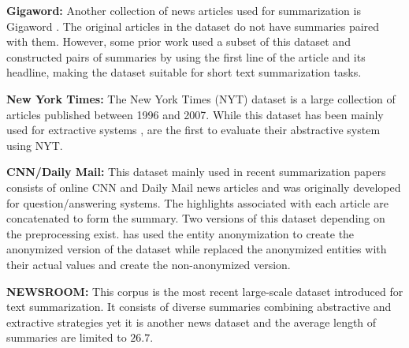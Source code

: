 \documentclass[11pt,a4paper]{article}
\begin{document}
\noindent\textbf{Gigaword:} Another collection of news articles used for summarization is Gigaword \cite{napoles2012annotated}. The original articles in the dataset do not have summaries paired with them. However, some prior work \cite{rush2015neural,chopra2016abstractive} used a subset of this dataset and constructed pairs of summaries by using the first line of the article and its headline, making the dataset suitable for short text summarization tasks.

\noindent\textbf{New York Times:} The New York Times (NYT) dataset \cite{sandhaus2008new} is a large collection of articles published between 1996 and 2007. While this dataset has been mainly used for extractive systems \cite{hong2014improving,durrett2016learning}, \citet{paulus2017deep} are the first to evaluate their abstractive system using NYT.

\noindent\textbf {CNN/Daily Mail:} This dataset mainly used in recent summarization papers ~\cite{nallapati2016abstractive,see2017get,nallapati2017summarunner} consists of online CNN and Daily Mail news articles and was originally developed for question/answering systems. The highlights associated with each article are concatenated to form the summary. Two versions of this dataset depending on the preprocessing exist. \citet{nallapati2017summarunner} has used the entity anonymization to create the anonymized version of the dataset while \citet{see2017get} replaced the anonymized entities with their actual values and create the non-anonymized version.


\noindent\textbf {NEWSROOM:} This corpus \cite{grusky2018newsroom} is the most recent large-scale dataset introduced for text summarization. It consists of diverse summaries combining abstractive and extractive strategies yet it is another news dataset and the average length of summaries are limited to $26.7$.
\end{document}

